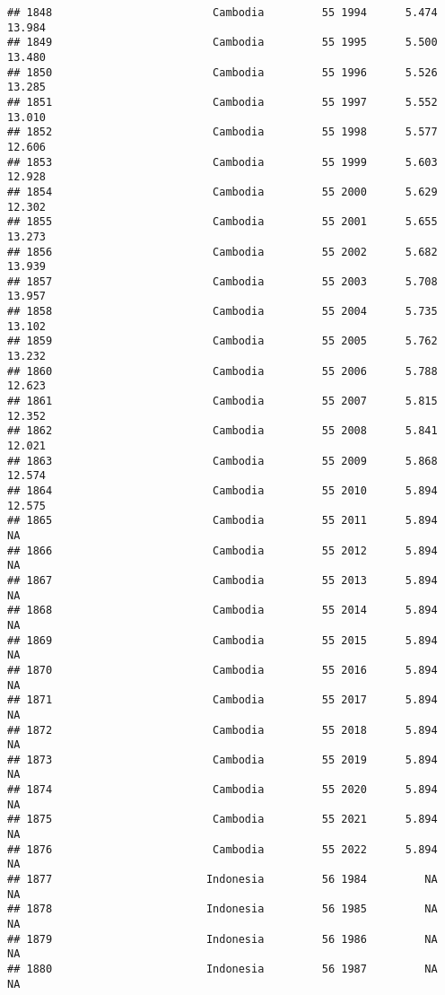 \documentclass[
]{article}
\begin{document}
\begin{verbatim}
## 1848                         Cambodia         55 1994      5.474     13.984
## 1849                         Cambodia         55 1995      5.500     13.480
## 1850                         Cambodia         55 1996      5.526     13.285
## 1851                         Cambodia         55 1997      5.552     13.010
## 1852                         Cambodia         55 1998      5.577     12.606
## 1853                         Cambodia         55 1999      5.603     12.928
## 1854                         Cambodia         55 2000      5.629     12.302
## 1855                         Cambodia         55 2001      5.655     13.273
## 1856                         Cambodia         55 2002      5.682     13.939
## 1857                         Cambodia         55 2003      5.708     13.957
## 1858                         Cambodia         55 2004      5.735     13.102
## 1859                         Cambodia         55 2005      5.762     13.232
## 1860                         Cambodia         55 2006      5.788     12.623
## 1861                         Cambodia         55 2007      5.815     12.352
## 1862                         Cambodia         55 2008      5.841     12.021
## 1863                         Cambodia         55 2009      5.868     12.574
## 1864                         Cambodia         55 2010      5.894     12.575
## 1865                         Cambodia         55 2011      5.894         NA
## 1866                         Cambodia         55 2012      5.894         NA
## 1867                         Cambodia         55 2013      5.894         NA
## 1868                         Cambodia         55 2014      5.894         NA
## 1869                         Cambodia         55 2015      5.894         NA
## 1870                         Cambodia         55 2016      5.894         NA
## 1871                         Cambodia         55 2017      5.894         NA
## 1872                         Cambodia         55 2018      5.894         NA
## 1873                         Cambodia         55 2019      5.894         NA
## 1874                         Cambodia         55 2020      5.894         NA
## 1875                         Cambodia         55 2021      5.894         NA
## 1876                         Cambodia         55 2022      5.894         NA
## 1877                        Indonesia         56 1984         NA         NA
## 1878                        Indonesia         56 1985         NA         NA
## 1879                        Indonesia         56 1986         NA         NA
## 1880                        Indonesia         56 1987         NA         NA

\end{verbatim}
\end{document}
